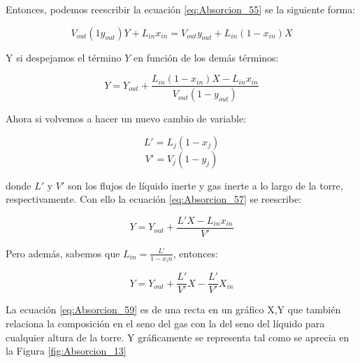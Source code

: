 \documentclass[11pt]{book}
\begin{document}
Entonces, podemos reescribir la ecuación \ref{eq:Absorcion_55} se la siguiente forma:

\begin{equation}
    \label{eq:Absorcion_56}
    V_{out} (1 y_{out}) Y + L_{in} x_{in} = V_{out} y_{out} + L_{in} (1-x_{in}) X
\end{equation}

Y si despejamos el término $Y$ en función de los demás términos:

\begin{equation}
    \label{eq:Absorcion_57}
    Y = Y_{out} + \frac{L_{in} (1-x_{in}) X - L_{in} x_{in}}{V_{out} (1-y_{out})}
\end{equation}

Ahora si volvemos a hacer un nuevo cambio de variable:

\begin{equation*}
    L' = L_j (1-x_j)
\end{equation*}
\begin{equation*}
    V' = V_j (1-y_j)
\end{equation*}

donde $L'$ y $V'$ son los flujos de líquido inerte y gas inerte a lo largo de la torre, respectivamente. Con ello la ecuación \ref{eq:Absorcion_57} se reescribe:

\begin{equation}
    \label{eq:Absorcion_58}
    Y = Y_{out} + \frac{L' X - L_{in} x_{in}}{V'}
\end{equation}

Pero además, sabemos que $L_{in} = \frac{L'}{1-x_in}$, entonces:

\begin{equation}
    \label{eq:Absorcion_59}
    Y = Y_{out} + \frac{L'}{V'} X - \frac{L'}{V'} X_{in}
\end{equation}

La ecuación \ref{eq:Absorcion_59} es de una recta en un gráfico X,Y que también relaciona la composición en el seno del gas con la del seno del líquido para cualquier altura de la torre. Y gráficamente se representa tal como se aprecia en la Figura \ref{fig:Absorcion_13}
\end{document}
